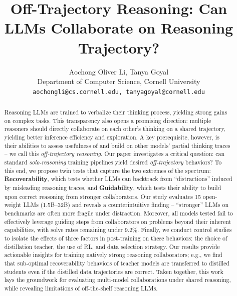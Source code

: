 \documentclass{article} %
\title{Off-Trajectory Reasoning: Can LLMs Collaborate on Reasoning Trajectory?}
\author{Aochong Oliver Li, Tanya Goyal\\
Department of Computer Science, Cornell University\\
\texttt{aochongli@cs.cornell.edu, tanyagoyal@cornell.edu} \\
}
\begin{document}
\maketitle

\begin{abstract}
Reasoning LLMs are trained to verbalize their thinking process, yielding strong gains on complex tasks. This transparency also opens a promising direction: multiple reasoners should directly collaborate on each other's thinking on a shared trajectory, yielding better inference efficiency and exploration. A key prerequisite, however, is their abilities to assess usefulness of and build on other models' partial thinking traces -- we call this \textit{off-trajectory reasoning}. Our paper investigates a critical question: can standard \textit{solo-reasoning} training pipelines yield desired \textit{off-trajectory} behaviors? To this end, we propose twin tests that capture the two extremes of the spectrum: \textbf{Recoverability}, which tests whether LLMs can backtrack from ``distractions'' induced by misleading reasoning traces, and \textbf{Guidability}, which tests their ability to build upon correct reasoning from stronger collaborators. Our study evaluates 15 open-weight LLMs (1.5B--32B) and reveals a counterintuitive finding -- ``stronger'' LLMs on benchmarks are often more fragile under distraction. Moreover, all models tested fail to effectively leverage guiding steps from collaborators on problems beyond their inherent capabilities, with solve rates remaining under 9.2\%. Finally, we conduct control studies to isolate the effects of three factors in post-training on these behaviors: the choice of distillation teacher, the use of RL, and data selection strategy. Our results provide actionable insights for training natively strong reasoning collaborators; e.g., we find that sub-optimal recoverability behaviors of teacher models are transferred to distilled students even if the distilled data trajectories are correct. Taken together, this work lays the groundwork for evaluating multi-model collaborations under shared reasoning, while revealing limitations of off-the-shelf reasoning LLMs.
\end{abstract}
\end{document}
